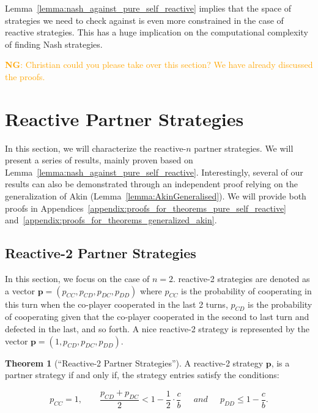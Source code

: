 \documentclass{article}
\newcommand{\nikoleta}[1]{\textcolor{orange}{\textbf{NG}: #1}}
\theoremstyle{definition}
\newtheorem{theorem}{Theorem}[section]
\begin{document}
Lemma~\ref{lemma:nash_against_pure_self_reactive} implies that the space of
strategies we need to check against is even more constrained in the case of
reactive strategies. This has a huge implication on the computational complexity
of finding Nash strategies.

\nikoleta{Christian could you please take over this section? We have already
discussed the proofs.}


\section{Reactive Partner Strategies}\label{section:reactive_strategies}

In this section, we will characterize the reactive-$n$ partner strategies. We
will present a series of results, mainly proven based on
Lemma~\ref{lemma:nash_against_pure_self_reactive}. Interestingly, several of our
results can also be demonstrated through an independent proof relying on the
generalization of Akin (Lemma~\ref{lemma:AkinGeneralised}). We will provide both
proofs in Appendices~\ref{appendix:proofs_for_theorems_pure_self_reactive}
and~\ref{appendix:proofs_for_theorems_generalized_akin}.


\subsection{Reactive-2 Partner Strategies}\label{section:reactive_two_partner_strategies}

In this section, we focus on the case of $n=2$. reactive-2 strategies are denoted as a vector
$\mathbf{p}=(p_{CC}, p_{CD}, p_{DC}, p_{DD})$ where $p_{CC}$ is the
probability of cooperating in this turn when the co-player cooperated in the
last 2 turns, $p_{CD}$ is the probability of cooperating given that the
co-player cooperated in the second to last turn and defected in the last, and so
forth. A nice reactive-2 strategy is represented by the vector $\mathbf{p}=(1,
p_{CD}, p_{DC}, p_{DD})$.

\begin{theorem}[``Reactive-2 Partner Strategies'']\label{theorem:reactive_two_partner_strategies}
A reactive-2 strategy $\mathbf{p}$, is a partner strategy if and only if,
the strategy entries satisfy the conditions:

\begin{equation}\label{eq:two_bit_conditions}
  p_{CC} = 1, \qquad \displaystyle \frac{p_{CD} + p_{DC}}{2} < 1 - \frac{1}{2} \cdot \frac{c}{b} \quad ~~and~~ \quad \displaystyle p_{DD} \leq 1\!-\! \frac{c}{b}.
\end{equation}
\end{theorem}
\end{document}
